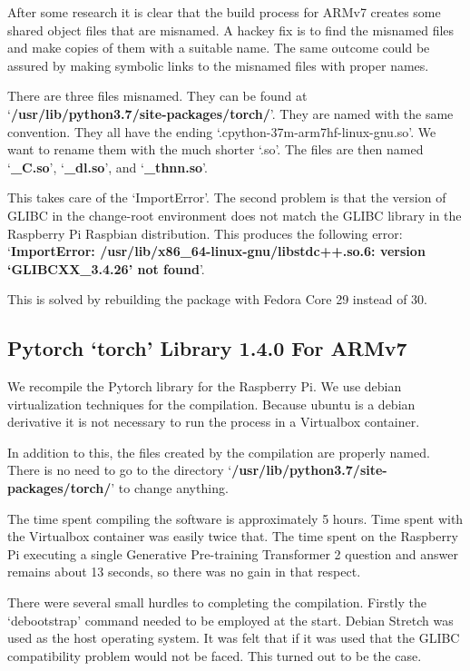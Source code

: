 After some research it is clear that the build process for ARMv7 creates some shared object files that are misnamed. A hackey fix is to find the misnamed files and make copies of them with a suitable name. The same outcome could be assured by making symbolic links to the misnamed files with proper names.

There are three files misnamed. They can be found at `\textbf{/usr/lib/python3.7/site-packages/torch/}'. They are named with the same convention. They all have the ending `.cpython-37m-arm7hf-linux-gnu.so'. We want to rename them with the much shorter `.so'. The files are then named `\textbf{\_C.so}', `\textbf{\_dl.so}', and `\textbf{\_thnn.so}'.

This takes care of the `ImportError'. The second problem is that the version of GLIBC in the change-root environment does not match the GLIBC library in the Raspberry Pi Raspbian distribution. This produces the following error: `\textbf{ImportError: /usr/lib/x86\_64-linux-gnu/libstdc++.so.6: version `GLIBCXX\_3.4.26' not found}'.

This is solved by rebuilding the package with Fedora Core 29 instead of 30. 
 
\subsection*{Pytorch `torch' Library 1.4.0 For ARMv7}
We recompile the Pytorch library for the Raspberry Pi. We use debian virtualization techniques for the compilation. Because ubuntu is a debian derivative it is not necessary to run the process in a Virtualbox container. 

In addition to this, the files created by the compilation are properly named. There is no need to go to the directory `\textbf{/usr/lib/python3.7/site-packages/torch/}' to change anything. 

The time spent compiling the software is approximately 5 hours. Time spent with the Virtualbox container was easily twice that. The time spent on the Raspberry Pi executing a single Generative Pre-training Transformer 2 question and answer remains about 13 seconds, so there was no gain in that respect.

There were several small hurdles to completing the compilation. Firstly the `debootstrap' command needed to be employed at the start. Debian Stretch was used as the host operating system. It was felt that if it was used that the GLIBC compatibility problem would not be faced. This turned out to be the case.

